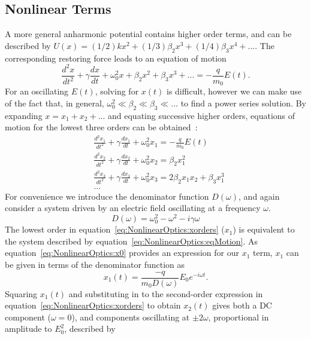 \subsection{Nonlinear Terms}
A more general anharmonic potential contains higher order terms, and can be described by $U(x) = (1/2)kx^{2} + (1/3)\beta_2 x^3 + (1/4)\beta_3 x^4 + ...$. The corresponding restoring force leads to an equation of motion
\begin{equation}\label{eq:NonlinearOptics:eqMotionNonlinear}
	\frac{d^2 x}{dt^2} + \gamma \frac{dx}{dt} + \omega_{0}^2 x + \beta_2 x^2 +  \beta_3 x^3 + ... = -\frac{q}{m_{0} } E(t).
\end{equation}
For an oscillating $E(t)$, solving for $x(t)$ is difficult, however we can make use of the fact that, in general, $\omega_{0}^2 \ll \beta_2 \ll \beta_3 \ll ...$ to find a power series solution. By expanding $x = x_1 + x_2 + ...$ and equating successive higher orders, equations of motion for the lowest three orders can be obtained~\cite[\S 1.4.1]{Boyd2008a}:
\begin{equation}\label{eq:NonlinearOptics:xorders}
	\begin{split}
		& \frac{d^2 x_1}{dt^2} + \gamma \frac{dx_1}{dt} + \omega_{0}^2 x_1 = -\frac{q}{m_{0} } E(t) \\
		& \frac{d^2 x_2}{dt^2} + \gamma \frac{dx_2}{dt} + \omega_{0}^2 x_2 = \beta_2 x_1^2 \\
		& \frac{d^2 x_3}{dt^2} + \gamma \frac{dx_3}{dt} + \omega_{0}^2 x_3 = 2\beta_2 x_1 x_2 + \beta_3 x_1^3 \\
		& ...
	\end{split}
\end{equation}
For convenience we introduce the denominator function $D(\omega)$, and again consider a system driven by an electric field oscillating at a frequency $\omega$.
\begin{equation}
	D(\omega) = \omega_{0}^2 -\omega^2 -i \gamma \omega
\end{equation}
The lowest order in equation~\ref{eq:NonlinearOptics:xorders} ($x_{1}$) is equivalent to the system described by equation~\ref{eq:NonlinearOptics:eqMotion}. As equation~\ref{eq:NonlinearOptics:x0} provides an expression for our $x_1$ term, $x_1$ can be given in terms of the denominator function as
\begin{equation}
	x_{1}(t) = \frac{-q}{m_0 D(\omega)} E_0 e^{-i\omega t}.
\end{equation}
Squaring $x_{1}(t)$ and substituting in to the second-order expression in equation~\ref{eq:NonlinearOptics:xorders} to obtain $x_{2}(t)$ gives both a DC component ($\omega=0$), and components oscillating at $\pm 2\omega$, proportional in amplitude to $E_{0}^2$, described by
